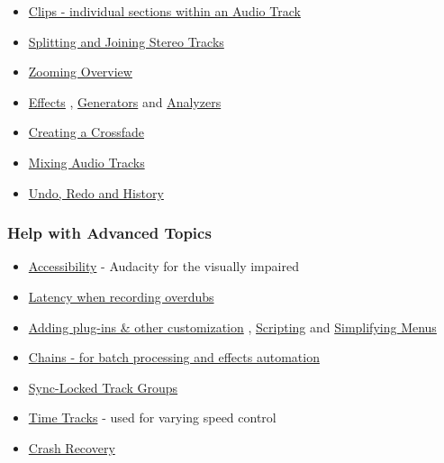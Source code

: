 \begin{multicols}{2}
\begin{itemize}
\item 
\hyperref[\foo{man:audacity:tracks:and:clips:}]{Clips - individual sections within an Audio Track}

\item 
\hyperref[\foo{man:splitting:and:joining:stereo:tracks:}]{Splitting and Joining Stereo Tracks}

\item 
\hyperref[\foo{man:zooming:}]{Zooming Overview}

\item 
\hyperref[\foo{man:index:of:effects:generators:and:analyzers:}]{Effects}
, 
\hyperref[\foo{man:index:of:effects:generators:and:analyzers:generators}]{Generators}
 and 
\hyperref[\foo{man:index:of:effects:generators:and:analyzers:analyzers}]{Analyzers}

\item 
\hyperref[\foo{man:creating:a:crossfade:}]{Creating a Crossfade}

\item 
\hyperref[\foo{man:mixing:}]{Mixing Audio Tracks}

\item 
\hyperref[\foo{man:undo:redo:and:history:}]{Undo, Redo and History}

\end{itemize}

\subsubsection{Help with Advanced Topics}
\begin{itemize}
\item 
\hyperref[\foo{man:accessibility:}]{Accessibility}
 - Audacity for the visually impaired 
\item 
\hyperref[\foo{man:latency:test:}]{Latency when recording overdubs}

\item 
\hyperref[\foo{man:customization:}]{Adding plug-ins \& other customization}
, 
\hyperref[\foo{man:scripting:}]{Scripting}
 and 
\hyperref[\foo{man:simplifying:audacity:}]{Simplifying Menus}

\item 
\hyperref[\foo{man:chains:for:batch:processing:and:effects:automation:}]{Chains - for batch processing and effects automation}

\item 
\hyperref[\foo{man:sync:locked:track:groups:}]{Sync-Locked Track Groups}

\item 
\hyperref[\foo{man:time:tracks:}]{Time Tracks}
 - used for varying speed control
\item 
\hyperref[\foo{man:recovery:}]{Crash Recovery}


\end{itemize}
\end{multicols}
